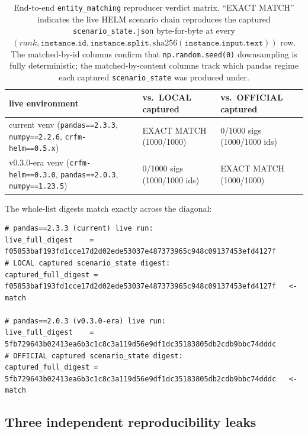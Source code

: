 \documentclass[11pt]{article}
\begin{document}
\begin{table}[htbp]
\centering
\small
\caption{End-to-end \texttt{entity\_matching} reproducer verdict
  matrix.
``EXACT MATCH'' indicates the live HELM scenario chain reproduces the
  captured \texttt{scenario\_state.json} byte-for-byte at every
  $(rank, \texttt{instance.id},
   \texttt{instance.split},
   \mathrm{sha256}(\texttt{instance.input.text}))$
  row.
The matched-by-id columns confirm that
  \texttt{np.random.seed(0)} downsampling is fully deterministic;
  the matched-by-content columns track which pandas regime each
  captured \texttt{scenario\_state} was produced under.}
\label{tab:tr-em-helm-mwe-matrix}
\begin{tabular}{lll}
\toprule
live environment & vs.\ LOCAL captured & vs.\ OFFICIAL captured \\
\midrule
current venv (\texttt{pandas==2.3.3}, \texttt{numpy==2.2.6},
  \texttt{crfm-helm==0.5.x})   & EXACT MATCH (1000/1000) &
  0/1000 sigs (1000/1000 ids) \\
v0.3.0-era venv (\texttt{crfm-helm==0.3.0}, \texttt{pandas==2.0.3},
  \texttt{numpy==1.23.5}) & 0/1000 sigs (1000/1000 ids) &
  EXACT MATCH (1000/1000) \\
\bottomrule
\end{tabular}
\end{table}

The whole-list digests match exactly across the diagonal:

\begin{lstlisting}[style=shell, caption={Live and captured digests
  from the end-to-end MWE.\label{lst:tr-em-mwe-digests}}]
# pandas==2.3.3 (current) live run:
live_full_digest    = f05853baf193fd1cce17d2d02ede53037e487373965c948c09137453efd4127f
# LOCAL captured scenario_state digest:
captured_full_digest = f05853baf193fd1cce17d2d02ede53037e487373965c948c09137453efd4127f   <- match

# pandas==2.0.3 (v0.3.0-era) live run:
live_full_digest    = 5fb729643b02413ea6b3c1c8c3a119d56e9df1dc35183805db2cdb9bbc74dddc
# OFFICIAL captured scenario_state digest:
captured_full_digest = 5fb729643b02413ea6b3c1c8c3a119d56e9df1dc35183805db2cdb9bbc74dddc   <- match
\end{lstlisting}

\subsection{Three independent reproducibility leaks}
\label{sec:tr-case-a-three-leaks}
\end{document}
